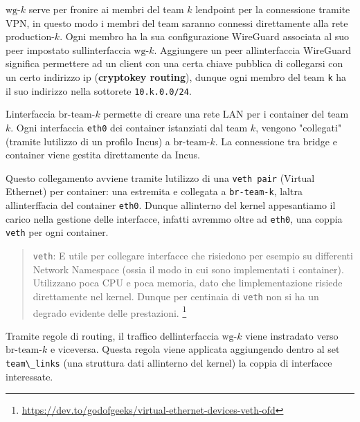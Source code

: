 \(\text{wg-}k\) serve per fronire ai membri del team \(k\)
l\textquotesingle endpoint per la connessione tramite VPN, in questo
modo i membri del team saranno connessi direttamente alla rete
\(\text{production-}k\). Ogni membro ha la sua configurazione WireGuard
associata al suo peer impostato sull\textquotesingle interfaccia
\(\text{wg-}k\). Aggiungere un peer all\textquotesingle interfaccia
WireGuard significa permettere ad un client con una certa chiave
pubblica di collegarsi con un certo indirizzo ip (\textbf{cryptokey
routing}), dunque ogni membro del team \passthrough{\lstinline!k!} ha il
suo indirizzo nella sottorete \passthrough{\lstinline!10.k.0.0/24!}.

L\textquotesingle interfaccia \(\text{br-team-}k\) permette di creare
una rete LAN per i container del team \(k\). Ogni interfaccia
\passthrough{\lstinline!eth0!} dei container istanziati dal team \(k\),
vengono "collegati" (tramite l\textquotesingle utilizzo di un profilo
Incus) a \(\text{br-team-}k\). La connessione tra bridge e container
viene gestita direttamente da Incus.

Questo collegamento avviene tramite l\textquotesingle utilizzo di una
\passthrough{\lstinline!veth pair!} (Virtual Ethernet) per container:
una estremita e\textquotesingle{} collegata a
\passthrough{\lstinline!br-team-k!}, l\textquotesingle altra
all\textquotesingle interffacia del container
\passthrough{\lstinline!eth0!}. Dunque all\textquotesingle interno del
kernel appesantiamo il carico nella gestione delle interfacce, infatti
avremmo oltre ad \passthrough{\lstinline!eth0!}, una coppia
\passthrough{\lstinline!veth!} per ogni container.

\begin{quote}
\passthrough{\lstinline!veth!}: E\textquotesingle{} utile per collegare
interfacce che risiedono per esempio su differenti Network Namespace
(ossia il modo in cui sono implementati i container). Utilizzano poca
CPU e poca memoria, dato che l\textquotesingle implementazione risiede
direttamente nel kernel. Dunque per centinaia di
\passthrough{\lstinline!veth!} non si ha un degrado evidente delle
prestazioni. \footnote{\label{fn:ref_15}\url{https://dev.to/godofgeeks/virtual-ethernet-devices-veth-ofd}}
\end{quote}

Tramite regole di routing, il traffico dell\textquotesingle interfaccia
\(\text{wg-}k\) viene instradato verso \(\text{br-team-}k\) e viceversa.
Questa regola viene applicata aggiungendo dentro al set
\passthrough{\lstinline!team\_links!} (una struttura dati
all\textquotesingle interno del kernel) la coppia di interfacce
interessate.


